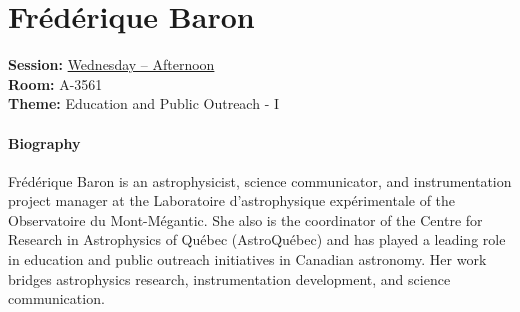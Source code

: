 \hypertarget{invited-frederique-baron}{}
\label{invited-page-frederique-baron}
\section{Frédérique Baron}
\textbf{Session:} \hyperlink{schedule-wednesday-afternoon-a-3561}{Wednesday -- Afternoon}\\
\textbf{Room:} A-3561\\
\textbf{Theme:} Education and Public Outreach - I\\

\paragraph{Biography}
{\sffamily
Frédérique Baron is an astrophysicist, science communicator, and instrumentation project manager at the Laboratoire d'astrophysique expérimentale of the Observatoire du Mont-Mégantic. She also is the coordinator of the Centre for Research in Astrophysics of Québec (AstroQuébec) and has played a leading role in education and public outreach initiatives in Canadian astronomy. Her work bridges astrophysics research, instrumentation development, and science communication.
}

